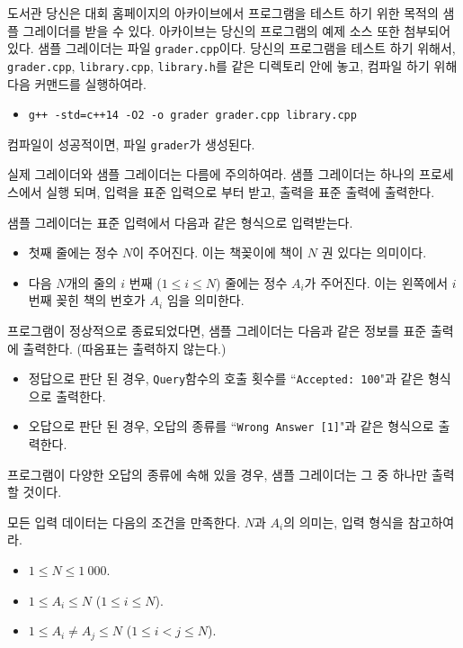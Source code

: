 \begin{problem}{도서관}
	당신은 대회 홈페이지의 아카이브에서 프로그램을 테스트 하기 위한 목적의 샘플 그레이더를 받을 수 있다. 아카이브는 당신의 프로그램의 예제 소스 또한 첨부되어 있다.
	샘플 그레이더는 파일 \texttt{grader.cpp}이다. 당신의 프로그램을 테스트 하기 위해서, \texttt{grader.cpp}, \texttt{library.cpp}, \texttt{library.h}를 같은 디렉토리 안에 놓고, 컴파일 하기 위해 다음 커맨드를 실행하여라.
	
	\begin{itemize}
		\item \texttt{g++ -std=c++14 -O2 -o grader grader.cpp library.cpp}
	\end{itemize}
	
	컴파일이 성공적이면, 파일 \texttt{grader}가 생성된다.
	
	실제 그레이더와 샘플 그레이더는 다름에 주의하여라. 샘플 그레이더는 하나의 프로세스에서 실행 되며, 입력을 표준 입력으로 부터 받고, 출력을 표준 출력에 출력한다.
	
	\InputFile
	
	샘플 그레이더는 표준 입력에서 다음과 같은 형식으로 입력받는다.
	
	\begin{itemize}
		\item 첫째 줄에는 정수 $N$이 주어진다. 이는 책꽂이에 책이 $N$ 권 있다는 의미이다.
		\item 다음 $N$개의 줄의 $i$ 번째 ($1 \le i \le N$) 줄에는 정수 $A_i$가 주어진다. 이는 왼쪽에서 $i$ 번째 꽂힌 책의 번호가 $A_i$ 임을 의미한다.
	\end{itemize}

	\OutputFile
	
	프로그램이 정상적으로 종료되었다면, 샘플 그레이더는 다음과 같은 정보를 표준 출력에 출력한다. (따옴표는 출력하지 않는다.)
	
	\begin{itemize}
		\item 정답으로 판단 된 경우, \texttt{Query}함수의 호출 횟수를 ``\texttt{Accepted: 100}"과 같은 형식으로 출력한다.
		\item 오답으로 판단 된 경우, 오답의 종류를 ``\texttt{Wrong Answer [1]}"과 같은 형식으로 출력한다.
	\end{itemize}
	
	프로그램이 다양한 오답의 종류에 속해 있을 경우, 샘플 그레이더는 그 중 하나만 출력 할 것이다.
	
	\Constraints
	
	모든 입력 데이터는 다음의 조건을 만족한다. $N$과 $A_i$의 의미는, 입력 형식을 참고하여라.
	
	\begin{itemize}
		\item $1 \le N \le 1\ 000$.
		\item $1 \le A_i \le N$ ($1 \le i \le N$).
		\item $1 \le A_i \ne A_j \le N$ ($1 \le i < j \le N$).
	\end{itemize}
	

\end{problem}
